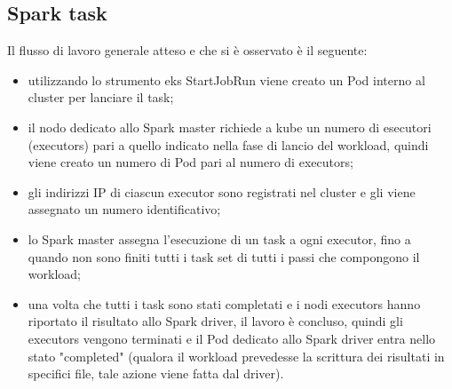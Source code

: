 \documentclass[12pt,a4paper,fleqn,titlepage]{report}
\begin{document}
        \subsection{Spark task}
            Il flusso di lavoro generale atteso e che si è osservato è il seguente:
            \begin{itemize}
                \item utilizzando lo strumento \gls{eks} StartJobRun viene creato un Pod interno al cluster per lanciare il task;
                \item il nodo dedicato allo Spark master richiede a \gls{kube} un numero di esecutori (executors) pari a quello indicato nella fase di lancio del workload, quindi viene creato un numero di Pod pari al numero di executors;
                \item gli indirizzi IP di ciascun executor sono registrati nel \gls{cluster} e gli viene assegnato un numero identificativo;
                \item lo Spark master assegna l'esecuzione di un task a ogni executor, fino a quando non sono finiti tutti i task set di tutti i passi che compongono il workload;
                \item una volta che tutti i task sono stati completati e i nodi executors hanno riportato il risultato allo Spark driver, il lavoro è concluso, quindi gli executors vengono terminati e il Pod dedicato allo Spark driver entra nello stato "completed" (qualora il workload prevedesse la scrittura dei risultati in specifici file, tale azione viene fatta dal driver).
            \end{itemize}
\end{document}
